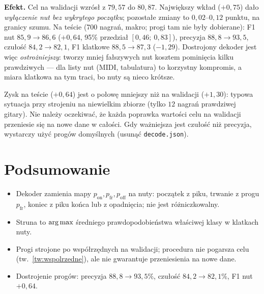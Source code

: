 \textbf{Efekt.} Cel na walidacji wzrósł z $79{,}57$ do $80{,}87$. Największy wkład ($+0{,}75$) dało \emph{wyłączenie nut bez wykrytego początku}; pozostałe zmiany to $0{,}02$--$0{,}12$ punktu, na granicy szumu.
Na teście (700 nagrań, makro; progi tam nie były dobierane): F1 nut $85{,}9\to86{,}6$ ($+0{,}64$, 95\% przedział $[0{,}46;\ 0{,}83]$), precyzja $88{,}8\to93{,}5$, czułość $84{,}2\to82{,}1$, F1 klatkowe $88{,}5\to87{,}3$ ($-1{,}29$).
Dostrojony dekoder jest więc \emph{ostrożniejszy}: tworzy mniej fałszywych nut kosztem pominięcia kilku prawdziwych --- dla listy nut (MIDI, tabulatura) to korzystny kompromis, a miara klatkowa na tym traci, bo nuty są nieco krótsze.

\begin{pulapka}
Zysk na teście ($+0{,}64$) jest o połowę mniejszy niż na walidacji ($+1{,}30$): typowa sytuacja przy strojeniu na niewielkim zbiorze (tylko $12$ nagrań prawdziwej gitary). Nie należy oczekiwać, że każda poprawka wartości celu na walidacji przeniesie się na nowe dane w całości. Gdy ważniejsza jest czułość niż precyzja, wystarczy użyć progów domyślnych (usunąć \texttt{decode.json}).
\end{pulapka}

\section*{Podsumowanie}
\begin{itemize}
\item Dekoder zamienia mapy $p_\mathrm{on},p_\mathrm{fr},p_\mathrm{off}$ na nuty: początek z piku, trwanie z progu $p_\mathrm{fr}$, koniec z piku końca lub z opadnięcia; nie jest różniczkowalny.
\item Struna to $\operatorname*{arg\,max}$ średniego prawdopodobieństwa właściwej klasy w klatkach nuty.
\item Progi strojone po współrzędnych na walidacji; procedura nie pogarsza celu (tw.~\ref{tw:wspolrzedne}), ale nie gwarantuje przeniesienia na nowe dane.
\item Dostrojenie progów: precyzja $88{,}8\to93{,}5\%$, czułość $84{,}2\to82{,}1\%$, F1 nut $+0{,}64$.
\end{itemize}

